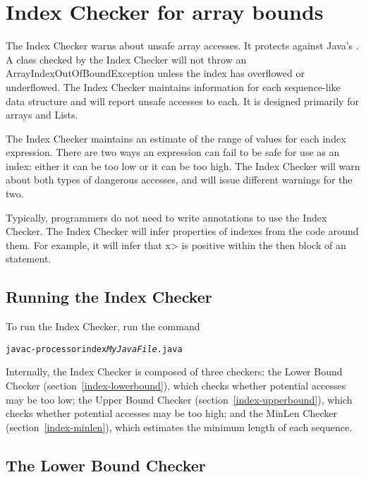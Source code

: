 \chapter{Index Checker for array bounds\label{index-checker}}

The Index Checker warns about unsafe array accesses.  It protects
against Java's
. A
class checked by the
Index Checker  will not throw an ArrayIndexOutOfBoundException unless the
index has overflowed or underflowed. The Index Checker maintains information
for each sequence-like data structure and will report unsafe accesses to each.
It is designed primarily for arrays and Lists.

The Index Checker maintains an estimate of the range of values for each
index expression.  There are two ways an expression can fail to be safe for use as an
index: either it can be too low or it can be too high. The Index
Checker will warn about both types of dangerous accesses, and will
issue different warnings for the two.

Typically, programmers do not need to write annotations to use the
Index Checker. The Index Checker will infer properties of indexes from
the code around them.  For example, it will infer that \<x> is positive
within the then block of an  statement.


\section{Running the Index Checker\label{index-running}}

To run the Index Checker, run the command

\begin{alltt}
  javac -processor index \emph{MyJavaFile}.java
\end{alltt}

Internally, the Index Checker is composed of three checkers: the Lower
Bound Checker (section~\ref{index-lowerbound}), which checks whether potential accesses may be too low;
the Upper Bound Checker (section~\ref{index-upperbound}), which checks whether potential accesses
may be too high; and the MinLen Checker (section~\ref{index-minlen}), which estimates the minimum
length of each sequence.


\section{The Lower Bound Checker\label{index-lowerbound}}

